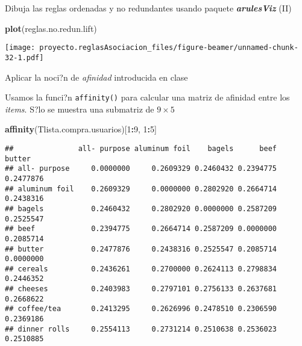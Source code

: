 \documentclass[
  ignorenonframetext,
]{beamer}
\newenvironment{Shaded}{\begin{snugshade}}{\end{snugshade}}
\newcommand{\DecValTok}[1]{\textcolor[rgb]{0.00,0.00,0.81}{#1}}
\newcommand{\KeywordTok}[1]{\textcolor[rgb]{0.13,0.29,0.53}{\textbf{#1}}}
\newcommand{\NormalTok}[1]{#1}
\newcommand{\OperatorTok}[1]{\textcolor[rgb]{0.81,0.36,0.00}{\textbf{#1}}}
\begin{document}
\begin{frame}[fragile]{Dibuja las reglas ordenadas y no redundantes
usando paquete \textbf{\emph{arulesViz}} (II)}
\protect\hypertarget{dibuja-las-reglas-ordenadas-y-no-redundantes-usando-paquete-arulesviz-ii}{}

\begin{Shaded}
\begin{Highlighting}[]
\KeywordTok{plot}\NormalTok{(reglas.no.redun.lift)}
\end{Highlighting}
\end{Shaded}

\texttt{[image: proyecto.reglasAsociacion\_files/figure-beamer/unnamed-chunk-32-1.pdf]}

\end{frame}

\begin{frame}[fragile]{Aplicar la noci?n de \emph{afinidad} introducida
en clase}
\protect\hypertarget{aplicar-la-nocin-de-afinidad-introducida-en-clase}{}

Usamos la funci?n \texttt{affinity()} para calcular una matriz de
afinidad entre los \emph{items}. S?lo se muestra una submatriz de
\(9\times5\)

\begin{Shaded}
\begin{Highlighting}[]
\KeywordTok{affinity}\NormalTok{(Tlista.compra.usuarios)[}\DecValTok{1}\OperatorTok{:}\DecValTok{9}\NormalTok{, }\DecValTok{1}\OperatorTok{:}\DecValTok{5}\NormalTok{]}
\end{Highlighting}
\end{Shaded}

\begin{verbatim}
##               all- purpose aluminum foil    bagels      beef    butter
## all- purpose     0.0000000     0.2609329 0.2460432 0.2394775 0.2477876
## aluminum foil    0.2609329     0.0000000 0.2802920 0.2664714 0.2438316
## bagels           0.2460432     0.2802920 0.0000000 0.2587209 0.2525547
## beef             0.2394775     0.2664714 0.2587209 0.0000000 0.2085714
## butter           0.2477876     0.2438316 0.2525547 0.2085714 0.0000000
## cereals          0.2436261     0.2700000 0.2624113 0.2798834 0.2446352
## cheeses          0.2403983     0.2797101 0.2756133 0.2637681 0.2668622
## coffee/tea       0.2413295     0.2626996 0.2478510 0.2306590 0.2369186
## dinner rolls     0.2554113     0.2731214 0.2510638 0.2536023 0.2510885
\end{verbatim}

\end{frame}
\end{document}
